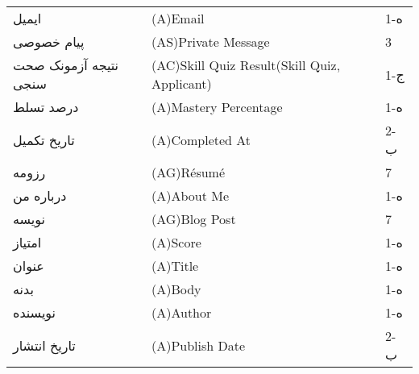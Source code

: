 \documentclass[12pt]{article}
\begin{document}
\begin{table}[]
\begin{tabular}{lll}
			ایمیل                                & (A)Email                                                                                                      & 1-ه   \\
			پیام خصوصی                           & (AS)Private Message                                                                                           & 3     \\
			نتیجه آزمونک صحت سنجی                & (AC)Skill Quiz Result(Skill Quiz, Applicant)                                                                  & 1-ج   \\
			درصد تسلط                            & (A)Mastery Percentage                                                                                         & 1-ه   \\
			تاریخ تکمیل                          & (A)Completed At                                                                                               & 2-ب   \\
			رزومه                                & (AG)Résumé                                                                                                    & 7     \\
			درباره من                            & (A)About Me                                                                                                   & 1-ه   \\
			نویسه                                & (AG)Blog Post                                                                                                 & 7     \\
			امتیاز                               & (A)Score                                                                                                      & 1-ه   \\
			عنوان                                & (A)Title                                                                                                      & 1-ه   \\
			بدنه                                 & (A)Body                                                                                                       & 1-ه   \\
			نویسنده                              & (A)Author                                                                                                     & 1-ه   \\
			تاریخ انتشار                         & (A)Publish Date                                                                                               & 2-ب   \\

\end{tabular}
\end{table}
\end{document}
